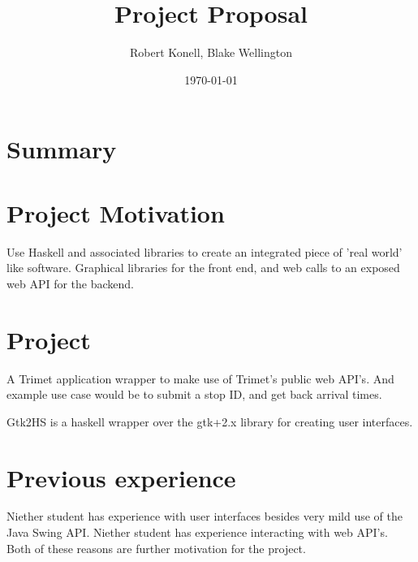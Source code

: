 \documentclass{article}
\title{Project Proposal}
\author{Robert Konell, Blake Wellington}
\date{\today}
\begin{document}
\maketitle
\thispagestyle{fancy}
\pagestyle{fancy}

\section*{Summary}

\section*{Project Motivation} 
Use Haskell and associated libraries to create an integrated piece of 'real world' like software.  Graphical libraries for the front end, and web calls to an exposed web API for the backend.

\section*{Project}
A Trimet application wrapper to make use of Trimet's public web API's.
And example use case would be to submit a stop ID, and get back arrival times.

Gtk2HS is a haskell wrapper over the gtk+2.x library for creating user interfaces.

\section*{Previous experience}
Niether student has experience with user interfaces besides very mild use of the Java Swing API.  Niether student has experience interacting with web API's.  Both of these reasons are further motivation for the project.
\end{document}
